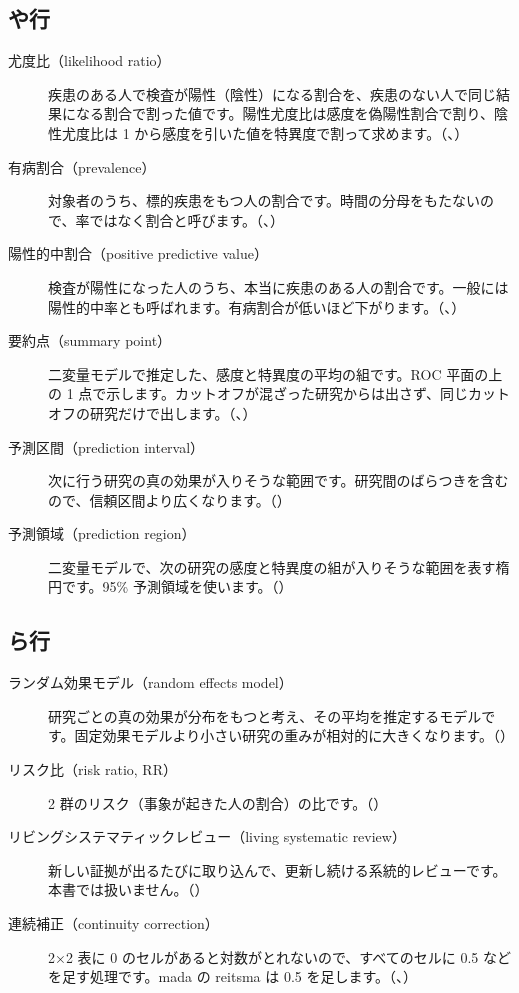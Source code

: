 \subsection*{や行}
\begin{description}
\item[尤度比（likelihood ratio）] 疾患のある人で検査が陽性（陰性）になる割合を、疾患のない人で同じ結果になる割合で割った値です。陽性尤度比は感度を偽陽性割合で割り、陰性尤度比は 1 から感度を引いた値を特異度で割って求めます。（、）
\item[有病割合（prevalence）] 対象者のうち、標的疾患をもつ人の割合です。時間の分母をもたないので、率ではなく割合と呼びます。（、）
\item[陽性的中割合（positive predictive value）] 検査が陽性になった人のうち、本当に疾患のある人の割合です。一般には陽性的中率とも呼ばれます。有病割合が低いほど下がります。（、）
\item[要約点（summary point）] 二変量モデルで推定した、感度と特異度の平均の組です。ROC 平面の上の 1 点で示します。カットオフが混ざった研究からは出さず、同じカットオフの研究だけで出します。（、）
\item[予測区間（prediction interval）] 次に行う研究の真の効果が入りそうな範囲です。研究間のばらつきを含むので、信頼区間より広くなります。（）
\item[予測領域（prediction region）] 二変量モデルで、次の研究の感度と特異度の組が入りそうな範囲を表す楕円です。95\% 予測領域を使います。（）
\end{description}

\subsection*{ら行}
\begin{description}
\item[ランダム効果モデル（random effects model）] 研究ごとの真の効果が分布をもつと考え、その平均を推定するモデルです。固定効果モデルより小さい研究の重みが相対的に大きくなります。（）
\item[リスク比（risk ratio, RR）] 2 群のリスク（事象が起きた人の割合）の比です。（）
\item[リビングシステマティックレビュー（living systematic review）] 新しい証拠が出るたびに取り込んで、更新し続ける系統的レビューです。本書では扱いません。（）
\item[連続補正（continuity correction）] 2×2 表に 0 のセルがあると対数がとれないので、すべてのセルに 0.5 などを足す処理です。mada の reitsma は 0.5 を足します。（、）
\end{description}

